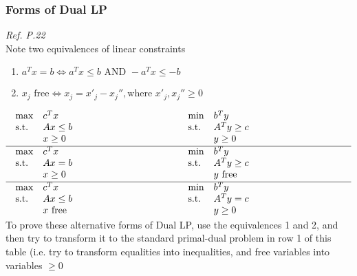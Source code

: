 \subsubsection{Forms of Dual LP}
{\itshape Ref. P.22}\\
Note two equivalences of linear constraints\\
\begin{enumerate}
 \item $a^Tx = b \Leftrightarrow a^Tx \leq b \text{ AND } -a^Tx \leq -b$
 \item $x_j \text{ free} \Leftrightarrow x_j = x'_j - x_j'',\text{where }x'_j, x_j'' \geq 0$
\end{enumerate}
$
\begin{array}[t]{p{6cm}p{6cm}}
  \begin{array}[t]{ll}
    \max	& c^Tx\\
    \text{s.t.}	& Ax \leq b\\
		& x \geq 0
  \end{array}
&
  \begin{array}[t]{ll}
    \min	& b^Ty\\
    \text{s.t.}	& A^Ty \geq c\\
		& y \geq 0
  \end{array}\\\hline
  \begin{array}[t]{ll}
    \max	& c^Tx\\
    \text{s.t.}	& Ax = b\\
		& x \geq 0
  \end{array}
&
  \begin{array}[t]{ll}
    \min	& b^Ty\\
    \text{s.t.}	& A^Ty \geq c\\
		& y \text{ free}
  \end{array}\\\hline
  \begin{array}[t]{ll}
    \max	& c^Tx\\
    \text{s.t.}	& Ax \leq b\\
		& x \text{ free}
  \end{array}
&
  \begin{array}[t]{ll}
    \min	& b^Ty\\
    \text{s.t.}	& A^Ty = c\\
		& y \geq 0
  \end{array}\\
\end{array}
$
\\
To prove these alternative forms of Dual LP, use the equivalences 1 and 2, and then try to transform it to the standard primal-dual problem in row 1 of this table (i.e. try to transform equalities into inequalities, and free variables into variables $\geq 0$\\
